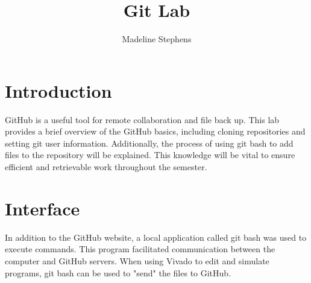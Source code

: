 \documentclass{article}
\author{Madeline Stephens}
\title{Git Lab}
\begin{document}
\maketitle

\section{Introduction}
GitHub is a useful tool for remote collaboration and file back up. This lab provides a brief overview of the GitHub basics, including cloning repositories and setting git user information. Additionally, the process of using git bash to add files to the repository will be explained. This knowledge will be vital to ensure efficient and retrievable work throughout the semester.

\section{Interface}
In addition to the GitHub website, a local application called git bash was used to execute commands. This program facilitated communication between the computer and GitHub servers. When using Vivado to edit and simulate programs, git bash can be used to "send" the files to GitHub. 
\end{document}
